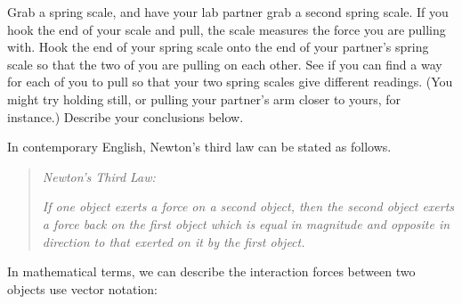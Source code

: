 
Grab a spring scale, and have your lab partner grab a second spring scale.  
If you hook the end of your scale and pull, the scale measures the force you are pulling with.
Hook the end of your spring scale onto the end of your partner's spring scale so that the two of you
are pulling on each other.  
See if you can find a way for each of you to pull so that your two spring scales give different readings.
(You might try holding still, or pulling your partner's arm closer to yours, for instance.)
Describe your conclusions below. 

\answerspace{30mm}

In contemporary English, Newton's third law can be stated as follows.

\begin{quote}
\textit{Newton's Third Law:}

\textit{If one object exerts a force on a second object, then the second object
exerts a force back on the first object which is equal in magnitude and opposite
in direction to that exerted on it by the first object.}
\end{quote}

In mathematical terms, we can describe the interaction forces between 
two objects use vector notation:

